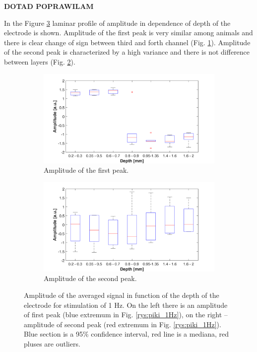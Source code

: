 \documentclass{pracalicmgr}
\begin{document}
\textbf{DOTAD POPRAWILAM}
\newpage

In the Figure \ref{rys:profil_1Hz_amp} laminar profile of amplitude in dependence of depth of the electrode is shown. Amplitude of the first peak is very similar among animals and there is clear change of sign between third and forth channel (Fig. \ref{rys:profil_1Hz_amp1}). Amplitude of the second peak is characterized by a high variance and there is not difference between layers (Fig. \ref{rys:profil_1Hz_amp2}).
  
\begin{figure}[H]
	\begin{subfigure}{.5\textwidth}
		\centering
		\includegraphics[width=1.\linewidth]{profile_1Hz_amp.png}
		\caption{Amplitude of the first peak.}
		\label{rys:profil_1Hz_amp1}
	\end{subfigure}%
	\begin{subfigure}{.5\textwidth}
		\centering
		\includegraphics[width=1.\linewidth]{profile_1Hz_amp2.png}
		\caption{Amplitude of the second peak.}
		\label{rys:profil_1Hz_amp2}
	\end{subfigure}
	
	\caption{Amplitude of the averaged signal in function of the depth of the electrode for stimulation of 1 Hz. On the left there is an amplitude of first peak  (blue extremum in Fig. \ref{rys:piki_1Hz}), on the right -- amplitude of second peak (red extremum in Fig. \ref{rys:piki_1Hz}). Blue section is a 95\% confidence interval, red line is a mediana, red pluses are outliers.}
	\label{rys:profil_1Hz_amp}
\end{figure}
\end{document}
